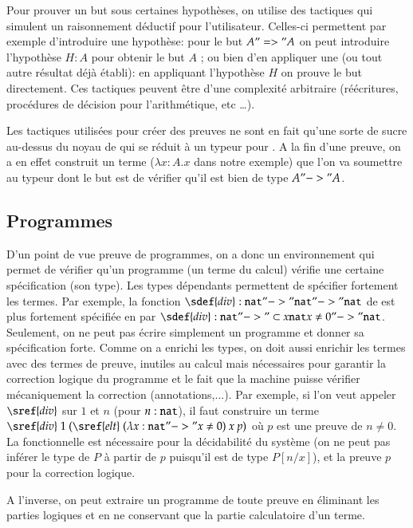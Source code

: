 Pour prouver un but sous certaines hypoth\`eses, on utilise des
tactiques qui simulent un raisonnement d\'eductif pour l'utilisateur.
Celles-ci permettent par exemple d'introduire une hypoth\`ese: pour le but
$A "=>" A$ on peut introduire l'hypoth\`ese $H : A$ pour obtenir le but
$A$ ; ou bien d'en appliquer une (ou tout autre r\'esultat d\'ej\`a \'etabli): 
en appliquant l'hypoth\`ese $H$ on prouve le but directement. 
Ces tactiques peuvent \^etre d'une complexit\'e arbitraire (r\'e\'ecritures,
proc\'edures de d\'ecision pour l'arithm\'etique, etc \ldots).

Les tactiques utilis\'ees pour cr\'eer des preuves ne sont en fait qu'une
sorte de sucre au-dessus du noyau de \Coq{} qui se r\'eduit \`a un typeur
pour \CCI. A la fin d'une preuve, on a en effet construit un terme 
($\lambda x : A. x$ dans notre exemple) que l'on va soumettre au typeur
dont le but est de v\'erifier qu'il est bien de type $A "->" A$.

\subsection{Programmes}
D'un point de vue preuve de programmes, on a donc un environnement qui
permet de v\'erifier qu'un programme (un terme du calcul) v\'erifie une
certaine sp\'ecification (son type). Les types d\'ependants permettent de
sp\'ecifier fortement les termes. Par exemple, la fonction $\sdef{div} :
\nat "->" \nat "->" \nat$ de \ML{} est plus fortement sp\'ecifi\'ee en 
\Coq{} par $\sdef{div} : \nat "->" \subset{x}{\nat}{x \neq 0} "->" \nat$.
Seulement, on ne peut pas \'ecrire simplement un programme \ML{} et
donner sa sp\'ecification forte. Comme on a enrichi les types, on doit 
aussi enrichir les termes avec des termes de preuve, inutiles au 
calcul mais n\'ecessaires pour garantir la
correction logique du programme et le fait que la machine puisse
v\'erifier m\'ecaniquement la correction (annotations,...). Par exemple,
 si l'on veut appeler $\sref{div}$ sur $1$ et $n$ (pour $n : \mathtt{nat}$), il
faut construire un terme $\sref{div}~1~(\sref{elt}~(\lambda x : \nat
"->" x \neq 0)~x~p)$ o\`u $p$ est une preuve de $n \neq 0$. La
fonctionnelle est n\'ecessaire pour la d\'ecidabilit\'e du syst\`eme (on ne peut
pas inf\'erer le type de $P$ \`a partir de $p$ puisqu'il est de type
$P[n/x]$), et la preuve $p$ pour la correction logique.

A l'inverse, on peut extraire un programme de toute preuve en \'eliminant les
parties logiques et en ne conservant que la partie calculatoire d'un terme.


